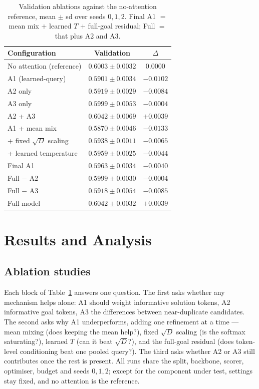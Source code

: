\documentclass[11pt]{article}
\begin{document}
\begin{table}[t]
  \centering
  \footnotesize
  \begin{tabular}{@{}lcc@{}}
    \toprule
    \textbf{Configuration} & \textbf{Validation} & \textbf{$\Delta$}\\
    \midrule
    No attention (reference) & $0.6003\pm0.0032$ & $0.0000$\\
    A1 (learned-query) & $0.5901\pm0.0034$ & $-0.0102$\\
    A2 only & $0.5919\pm0.0029$ & $-0.0084$\\
    A3 only & $0.5999\pm0.0053$ & $-0.0004$\\
    A2 + A3 & $0.6042\pm0.0069$ & $+0.0039$\\
    \midrule
    A1 + mean mix & $0.5870\pm0.0046$ & $-0.0133$\\
    \quad+ fixed $\sqrt D$ scaling & $0.5938\pm0.0011$ & $-0.0065$\\
    \quad+ learned temperature & $0.5959\pm0.0025$ & $-0.0044$\\
    Final A1 & $0.5963\pm0.0034$ & $-0.0040$\\
    \midrule
    Full $-$ A2 & $0.5999\pm0.0030$ & $-0.0004$\\
    Full $-$ A3 & $0.5918\pm0.0054$ & $-0.0085$\\
    Full model & $0.6042\pm0.0032$ & $+0.0039$\\
    \bottomrule
  \end{tabular}
  \caption{Validation ablations against the no-attention reference, mean
  $\pm$ sd over seeds $0,1,2$. Final A1 $=$ mean mix $+$ learned $T$ $+$
  full-goal residual; Full $=$ that plus A2 and A3.}
  \label{tab:ablation}
\end{table}

\section{Results and Analysis}

\subsection{Ablation studies}

Each block of Table~\ref{tab:ablation} answers one question. The first asks
whether any mechanism helps alone: A1 should weight informative solution
tokens, A2 informative goal tokens, A3 the differences between near-duplicate
candidates. The second asks why A1 underperforms, adding one refinement at a
time --- mean mixing (does keeping the mean help?), fixed $\sqrt D$ scaling
(is the softmax saturating?), learned $T$ (can it beat $\sqrt D$?), and the
full-goal residual (does token-level conditioning beat one pooled query?). The
third asks whether A2 or A3 still contributes once the rest is present. All
runs share the split, backbone, scorer, optimiser, budget and seeds $0,1,2$;
except for the component under test, settings stay fixed, and no attention is
the reference.
\end{document}

